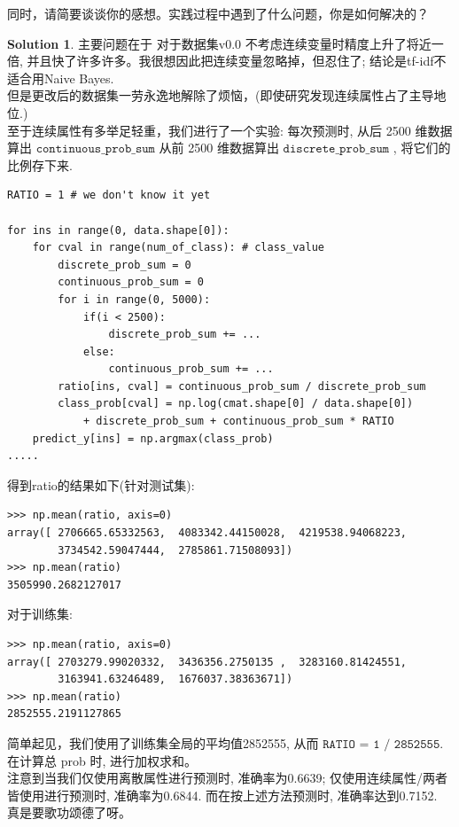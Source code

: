 \documentclass[a4paper,UTF8]{article}
\numberwithin{equation}{section}
\theoremstyle{definition}
\newtheorem*{solution}{Solution}
\begin{document}
同时，请简要谈谈你的感想。实践过程中遇到了什么问题，你是如何解决的？
\begin{solution}
主要问题在于  对于数据集v0.0 不考虑连续变量时精度上升了将近一倍, 并且快了许多许多。我很想因此把连续变量忽略掉，但忍住了; 结论是tf-idf不适合用Naive Bayes. \\
但是更改后的数据集一劳永逸地解除了烦恼，(即使研究发现连续属性占了主导地位.) \\
至于连续属性有多举足轻重，我们进行了一个实验: 每次预测时, 从后 2500 维数据算出 
$\texttt{continuous\_prob\_sum}$
从前 2500 维数据算出 $\texttt{discrete\_prob\_sum}$ , 将它们的比例存下来. 
\begin{verbatim}
RATIO = 1 # we don't know it yet

for ins in range(0, data.shape[0]):
	for cval in range(num_of_class): # class_value
		discrete_prob_sum = 0          
		continuous_prob_sum = 0  
		for i in range(0, 5000):
			if(i < 2500):
				discrete_prob_sum += ...
			else:
				continuous_prob_sum += ...
		ratio[ins, cval] = continuous_prob_sum / discrete_prob_sum	
		class_prob[cval] = np.log(cmat.shape[0] / data.shape[0]) 
	  		+ discrete_prob_sum + continuous_prob_sum * RATIO
	predict_y[ins] = np.argmax(class_prob)
.....
\end{verbatim}
得到ratio的结果如下(针对测试集): 
\begin{verbatim}
>>> np.mean(ratio, axis=0) 
array([ 2706665.65332563,  4083342.44150028,  4219538.94068223,
        3734542.59047444,  2785861.71508093])
>>> np.mean(ratio)
3505990.2682127017
\end{verbatim}
对于训练集: 
\begin{verbatim}
>>> np.mean(ratio, axis=0) 
array([ 2703279.99020332,  3436356.2750135 ,  3283160.81424551,
        3163941.63246489,  1676037.38363671])
>>> np.mean(ratio)
2852555.2191127865
\end{verbatim}
简单起见，我们使用了训练集全局的平均值2852555, 从而 $\texttt{RATIO = 1 / 2852555}$.在计算总 prob 时, 进行加权求和。 \\
注意到当我们仅使用离散属性进行预测时, 准确率为0.6639; 仅使用连续属性/两者皆使用进行预测时, 准确率为0.6844. 而在按上述方法预测时, 准确率达到0.7152. \\
真是要歌功颂德了呀。
~\\
~\\
~\\
\end{solution}
\end{document}
